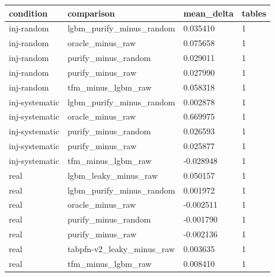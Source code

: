 \begin{tabular}{llll}
\hline
condition & comparison & mean\_delta & tables \\
\hline
inj-random & lgbm\_purify\_minus\_random & 0.035410 & 1 \\
inj-random & oracle\_minus\_raw & 0.075658 & 1 \\
inj-random & purify\_minus\_random & 0.029011 & 1 \\
inj-random & purify\_minus\_raw & 0.027990 & 1 \\
inj-random & tfm\_minus\_lgbm\_raw & 0.058318 & 1 \\
inj-systematic & lgbm\_purify\_minus\_random & 0.002878 & 1 \\
inj-systematic & oracle\_minus\_raw & 0.669975 & 1 \\
inj-systematic & purify\_minus\_random & 0.026593 & 1 \\
inj-systematic & purify\_minus\_raw & 0.025877 & 1 \\
inj-systematic & tfm\_minus\_lgbm\_raw & -0.028948 & 1 \\
real & lgbm\_leaky\_minus\_raw & 0.050157 & 1 \\
real & lgbm\_purify\_minus\_random & 0.001972 & 1 \\
real & oracle\_minus\_raw & -0.002511 & 1 \\
real & purify\_minus\_random & -0.001790 & 1 \\
real & purify\_minus\_raw & -0.002136 & 1 \\
real & tabpfn-v2\_leaky\_minus\_raw & 0.003635 & 1 \\
real & tfm\_minus\_lgbm\_raw & 0.008410 & 1 \\
\hline
\end{tabular}
